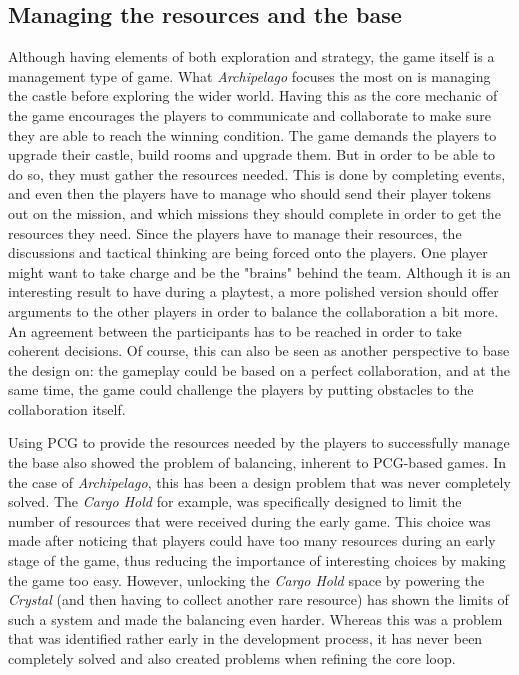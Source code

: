 \subsection{Managing the resources and the base}
\label{sec:management}
Although having elements of both exploration and strategy, the game itself is a management type of game. What \textit{Archipelago} focuses the most on is managing the castle before exploring the wider world. Having this as the core mechanic of the game encourages the players to communicate and collaborate to make sure they are able to reach the winning condition. The game demands the players to upgrade their castle, build rooms and upgrade them. But in order to be able to do so, they must gather the resources needed. This is done by completing events, and even then the players have to manage who should send their player tokens out on the mission, and which missions they should complete in order to get the resources they need. Since the players have to manage their resources, the discussions and tactical thinking are being forced onto the players. One player might want to take charge and be the "brains" behind the team. Although it is an interesting result to have during a playtest, a more polished version should offer arguments to the other players in order to balance the collaboration a bit more. An agreement between the participants has to be reached in order to take coherent decisions. Of course, this can also be seen as another perspective to base the design on: the gameplay could be based on a perfect collaboration, and at the same time, the game could challenge the players by putting obstacles to the collaboration itself. 

Using PCG to provide the resources needed by the players to successfully manage the base also showed the problem of balancing, inherent to PCG-based games. In the case of \textit{Archipelago}, this has been a design problem that was never completely solved. The \textit{Cargo Hold} for example, was specifically designed to limit the number of resources that were received during the early game. This choice was made after noticing that players could have too many resources during an early stage of the game, thus reducing the importance of interesting choices by making the game too easy. However, unlocking the \textit{Cargo Hold} space by powering the \textit{Crystal} (and then having to collect another rare resource) has shown the limits of such a system and made the balancing even harder. Whereas this was a problem that was identified rather early in the development process, it has never been completely solved and also created problems when refining the core loop.

